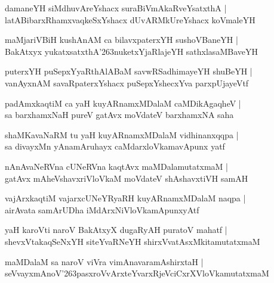 \documentclass[twoside,12pt,openright]{book}
\def\S{\char'263}
\newcounter{shloka}[chapter]
\begin{document}
\begin{shloka}%
damaneYH siMdhuvAreYshacx suraBiVmAkaRveYsatxthA |\\
latABibarxRhamxvaqkeSxYshacx dUvARMkUreYshacx koVmaleYH 
\end{shloka}

\begin{shloka}%
maMjariVBiH kushAnAM ca bilavxpaterxYH sushoVBaneYH |\\
BakAtxyx yukatxsatxthA\S nuketxYjaRlajeYH sathxlasaMBaveYH 
\end{shloka}

\begin{shloka}%
puterxYH puSepxYyaRthAlABaM savwRSadhimayeYH shuBeYH |\\
vanAyxnAM savaRpaterxYshacx puSepxYshecxYva parxpUjayeVtf 
\end{shloka}

\begin{shloka}%
padAmxkaqtiM ca yaH kuyARnamxMDalaM caMDikAgaqheV |\\
sa barxhamxNaH pureV gatAvx moVdateV barxhamxNA saha
\end{shloka}

\begin{shloka}%
shaMKavaNaRM tu yaH kuyARnamxMDalaM vidhinanxqqpa |\\
sa divayxMn yAnamAruhayx caMdarxloVkamavApunx yatf
\end{shloka}

\begin{shloka}%
nAnAvaNeRVna cUNeRVna kaqtAvx maMDalamutatxmaM |\\
gatAvx mAheVshavxriVloVkaM moVdateV shAshavxtiVH samAH 
\end{shloka}

\begin{shloka}%
vajArxkaqtiM vajarxcUNeYRyaRH kuyARnamxMDalaM naqpa |\\
airAvata samArUDha iMdArxNiVloVkamApunxyAtf 
\end{shloka}

\begin{shloka}%
yaH karoVti naroV BakAtxyX dugaRyAH puratoV mahatf |\\
shevxVtakaqSeNxYH siteYvaRNeYH shirxVvatAsxMkitamutatxmaM
\end{shloka}

\begin{shloka}%
maMDalaM sa naroV viVra vimAnavaramAshirxtaH |\\
seVvayxmAnoV\S pasxroVvArxteYvarxRjeVciCxrXVloVkamutatxmaM 
\end{shloka}
\end{document}
